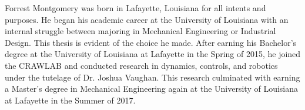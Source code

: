 \begin{biosketch} %
Forrest Montgomery was born in Lafayette, Louisiana for all intents and purposes. He began his academic career at the University of Louisiana with an internal struggle between majoring in Mechanical Engineering or Industrial Design. This thesis is evident of the choice he made. After earning his Bachelor's degree at the University of Louisiana at Lafayette in the Spring of 2015, he joined the CRAWLAB and conducted research in dynamics, controls, and robotics under the tutelage of Dr. Joshua Vaughan. This research culminated with earning a Master's degree in Mechanical Engineering again at the University of Louisiana at Lafayette in the Summer of 2017.
\end{biosketch}
